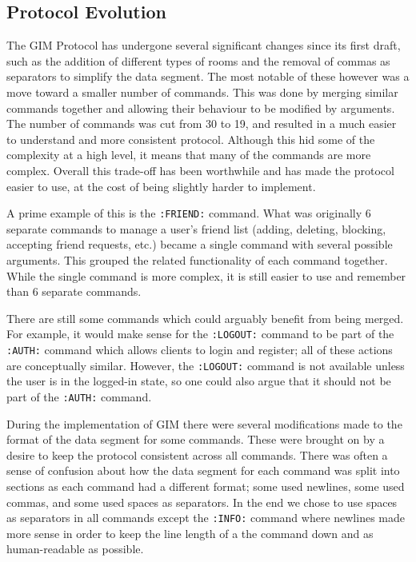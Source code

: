 \subsection{Protocol Evolution}
\label{protocol_evol}

The GIM Protocol has undergone several significant changes since its first draft, such as the addition of different types of rooms and the removal of commas as separators to simplify the data segment. The most notable of these however was a move toward a smaller number of commands. This was done by merging similar commands together and allowing their behaviour to be modified by arguments. The number of commands was cut from 30 to 19, and resulted in a much easier to understand and more consistent protocol. Although this hid some of the complexity at a high level, it means that many of the commands are more complex. Overall this trade-off has been worthwhile and has made the protocol easier to use, at the cost of being slightly harder to implement.

A prime example of this is the \texttt{:FRIEND:} command. What was originally 6 separate commands to manage a user's friend list (adding, deleting, blocking, accepting friend requests, etc.) became a single command with several possible arguments. This grouped the related functionality of each command together. While the single command is more complex, it is still easier to use and remember than 6 separate commands.

There are still some commands which could arguably benefit from being merged. For example, it would make sense for the \texttt{:LOGOUT:} command to be part of the \texttt{:AUTH:} command which allows clients to login and register; all of these actions are conceptually similar. However, the \texttt{:LOGOUT:} command is not available unless the user is in the logged-in state, so one could also argue that it should not be part of the \texttt{:AUTH:} command.

During the implementation of GIM there were several modifications made to the format of the data segment for some commands. These were brought on by a desire to keep the protocol consistent across all commands. There was often a sense of confusion about how the data segment for each command was split into sections as each command had a different format; some used newlines, some used commas, and some used spaces as separators. In the end we chose to use spaces as separators in all commands except the \texttt{:INFO:} command where newlines made more sense in order to keep the line length of a the command down and as human-readable as possible.

